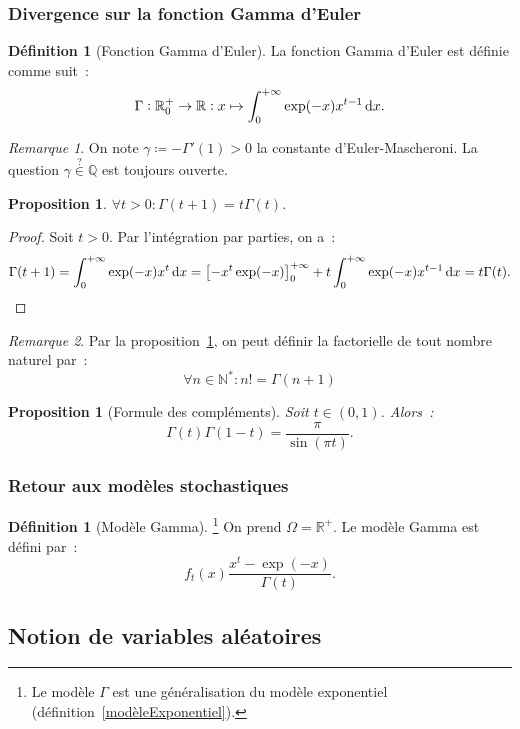 \documentclass{article}
\newcommand{\N}{\mathbb N}
\newcommand{\Q}{\mathbb Q}
\newcommand{\R}{\mathbb R}
\newtheorem{prp}[thm]{Proposition}
\theoremstyle{definition}
\newtheorem{déf}[thm]{Définition}
\theoremstyle{remark}
\newtheorem*{rmq}{Remarque}
\begin{document}
		\subsubsection{Divergence sur la fonction Gamma d'Euler}

		\begin{déf}[Fonction Gamma d'Euler] La fonction Gamma d'Euler est définie comme suit~:
		\[\Gamma : \R_0^+ \to \R : x \mapsto \int_0^{+\infty}\exp(-x)x^{t-1}\dif x.\] \end{déf}
		
		\begin{rmq} On note $\gamma \coloneqq -\Gamma'(1) > 0$ la constante d'Euler-Mascheroni. La question $\gamma \stackrel{?}{\in} \Q$ est toujours ouverte.
		\end{rmq}

		\begin{prp}\label{GammaRecursif} $\forall t > 0 : \Gamma(t+1) = t\Gamma(t)$. \end{prp}

		\begin{proof} Soit $t > 0$. Par l'intégration par parties, on a~:
		\[\Gamma(t+1) = \int_0^{+\infty}\exp(-x)x^{t}\dif x = \left[-x^t\exp(-x)\right]_0^{+\infty} + t\int_0^{+\infty}\exp(-x)x^{t-1}\dif x = t\Gamma(t).\]
		\end{proof}

		\begin{rmq} Par la proposition~\ref{GammaRecursif}, on peut définir la factorielle de tout nombre naturel par~:
		\[\forall n \in \N^* : n! = \Gamma(n+1)\]
		\end{rmq}

		\begin{prp}[Formule des compléments] Soit $t \in (0, 1)$. Alors~:
		\[\Gamma(t)\Gamma(1-t) = \frac \pi{\sin(\pi t)}.\]
		\end{prp}

		\subsubsection{Retour aux modèles stochastiques}

		\begin{déf}[Modèle Gamma]\footnote{Le modèle $\Gamma$ est une généralisation du modèle exponentiel (définition~\ref{modèleExponentiel}).}
		On prend $\Omega = \R^+$. Le modèle Gamma est défini par~:
		\[f_t(x) \frac {x^t-\exp(-x)}{\Gamma(t)}.\]
		\end{déf}

	\subsection{Notion de variables aléatoires}
\end{document}

